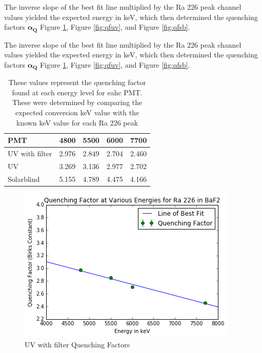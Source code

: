 \documentclass[aip, jmp, amsmath, amssymb, reprint, floatfix]{revtex4-1}
\begin{document}
The inverse slope of the best fit line multiplied by the Ra 226 peak channel values yielded the expected energy in keV, which then determined the quenching factors $\bm{\alpha_Q}$ Figure \ref{fig:qff}, Figure \ref{fig:qfuv}, and Figure \ref{fig:qfsb}.

The inverse slope of the best fit line multiplied by the Ra 226 peak channel values yielded the expected energy in keV, which then determined the quenching factors $\bm{\alpha_Q}$ Figure \ref{fig:qff}, Figure \ref{fig:qfuv}, and Figure \ref{fig:qfsb}.

\begin{table}
    \begin{tabular}{ | l | l | l | l | p{2cm} |}
    \hline
    PMT & 4800 & 5500 & 6000 & 7700\\ \hline

    UV with filter & 2.976 & 2.849 & 2.704 & 2.460\\ \hline  

    UV & 3.269 & 3.136 & 2.977 & 2.702\\ \hline

    Solarblind & 5.155 & 4.789 & 4.475 & 4.166\\ \hline
    \hline
    \end{tabular}
    \caption{These values represent the quenching factor found at each energy level for eahc PMT. These were determined by comparing the expected conversion keV value with the known keV value for each Ra 226 peak}
    \label{table:quench}
\end{table}

\begin{figure}
  \centering
    \includegraphics[width=.8\columnwidth]{qff.png}
  \caption{UV with filter Quenching Factors}
  \label{fig:qff}
\end{figure} 
\end{document}
